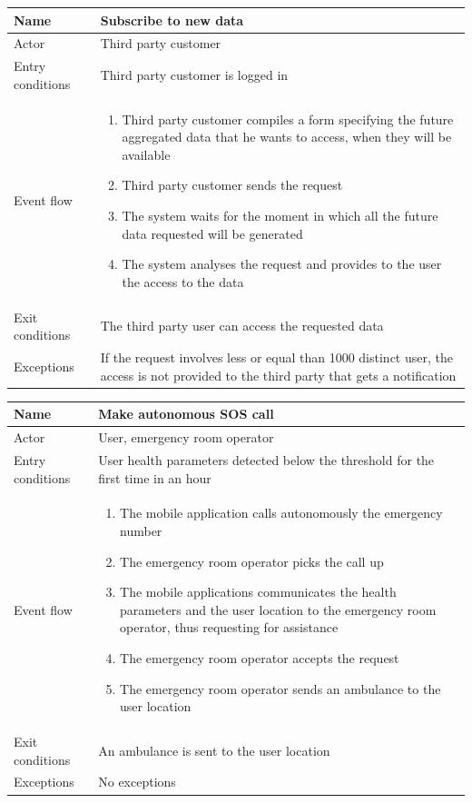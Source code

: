 \begin{table}[H]
\begin{tabularx}{\textwidth}{|l|X|}
\hline
 Name & Subscribe to new data \\ \hline
 Actor & Third party customer  \\ \hline
 Entry conditions & Third party customer is logged in \\ \hline
 Event flow & 
 \begin{enumerate}
 	\item Third party customer compiles a form specifying the future aggregated data that he wants to access, when they will be available
 	\item Third party customer sends the request
 	\item The system waits for the moment in which all the future data requested will be generated 
 	\item The system analyses the request and provides to the user the access to the data 
 \end{enumerate}   \\ \hline
 Exit conditions & The third party user can access the requested data \\ \hline
 Exceptions & If the request involves less or equal than 1000 distinct user, the access is not provided to the third party that gets a notification \\ \hline
\end{tabularx}
\end{table}

\begin{table}[H]
\begin{tabularx}{\textwidth}{|l|X|}
\hline
 Name & Make autonomous SOS call \\ \hline
 Actor & User, emergency room operator \\ \hline
 Entry conditions & User health parameters detected below the threshold for the first time in an hour \\ \hline
 Event flow & 
 \begin{enumerate}
 	\item The mobile application calls autonomously the emergency number 
 	\item The emergency room operator picks the call up 
 	\item The mobile applications communicates the health parameters and the user location to the emergency room operator, thus requesting for assistance 
 	\item The emergency room operator accepts the request
 	\item The emergency room operator sends an ambulance to the user location
 \end{enumerate}   \\ \hline
 Exit conditions & An ambulance is sent to the user location \\ \hline
 Exceptions & No exceptions \\ \hline
\end{tabularx}
\end{table}

